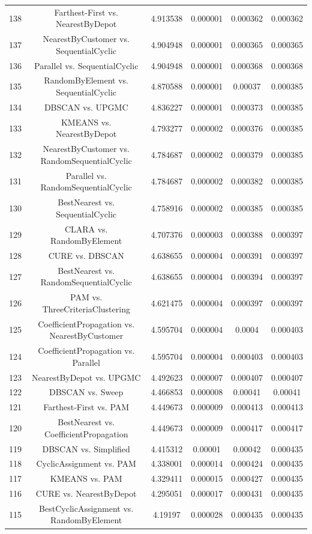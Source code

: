 \documentclass[a4paper,10pt]{article}
\begin{document}
\begin{landscape}
\begin{table}[!htp]
\begin{tabular}{cccccc}
138&Farthest-First vs. NearestByDepot&4.913538&0.000001&0.000362&0.000362\\
137&NearestByCustomer vs. SequentialCyclic&4.904948&0.000001&0.000365&0.000365\\
136&Parallel vs. SequentialCyclic&4.904948&0.000001&0.000368&0.000368\\
135&RandomByElement vs. SequentialCyclic&4.870588&0.000001&0.00037&0.000385\\
134&DBSCAN vs. UPGMC&4.836227&0.000001&0.000373&0.000385\\
133&KMEANS vs. NearestByDepot&4.793277&0.000002&0.000376&0.000385\\
132&NearestByCustomer vs. RandomSequentialCyclic&4.784687&0.000002&0.000379&0.000385\\
131&Parallel vs. RandomSequentialCyclic&4.784687&0.000002&0.000382&0.000385\\
130&BestNearest vs. SequentialCyclic&4.758916&0.000002&0.000385&0.000385\\
129&CLARA vs. RandomByElement&4.707376&0.000003&0.000388&0.000397\\
128&CURE vs. DBSCAN&4.638655&0.000004&0.000391&0.000397\\
127&BestNearest vs. RandomSequentialCyclic&4.638655&0.000004&0.000394&0.000397\\
126&PAM vs. ThreeCriteriaClustering&4.621475&0.000004&0.000397&0.000397\\
125&CoefficientPropagation vs. NearestByCustomer&4.595704&0.000004&0.0004&0.000403\\
124&CoefficientPropagation vs. Parallel&4.595704&0.000004&0.000403&0.000403\\
123&NearestByDepot vs. UPGMC&4.492623&0.000007&0.000407&0.000407\\
122&DBSCAN vs. Sweep&4.466853&0.000008&0.00041&0.00041\\
121&Farthest-First vs. PAM&4.449673&0.000009&0.000413&0.000413\\
120&BestNearest vs. CoefficientPropagation&4.449673&0.000009&0.000417&0.000417\\
119&DBSCAN vs. Simplified&4.415312&0.00001&0.00042&0.000435\\
118&CyclicAssignment vs. PAM&4.338001&0.000014&0.000424&0.000435\\
117&KMEANS vs. PAM&4.329411&0.000015&0.000427&0.000435\\
116&CURE vs. NearestByDepot&4.295051&0.000017&0.000431&0.000435\\
115&BestCyclicAssignment vs. RandomByElement&4.19197&0.000028&0.000435&0.000435\\

\end{tabular}
\end{table}
\end{landscape}
\end{document}
